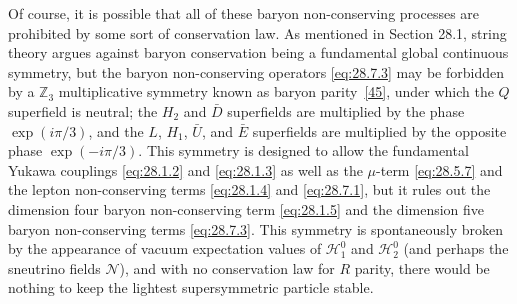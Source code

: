 Of course, it is possible that all of these baryon non-conserving processes
are prohibited by some sort of conservation law. As mentioned in Section
28.1, string theory argues against baryon conservation being a fundamental
global continuous symmetry, but the baryon non-conserving operators
\eqref{eq:28.7.3} may be forbidden by a \(\mathbb Z_3\) multiplicative
symmetry known as baryon parity~\hyperref[ch28-ref-45]{[45]}, under which the \(Q\)
superfield is neutral; the \(H_2\) and \(\bar D\) superfields are multiplied
by the phase \(\exp(i\pi/3)\), and the \(L\), \(H_1\), \(\bar U\), and
\(\bar E\) superfields are multiplied by the opposite phase
\(\exp(-i\pi/3)\). This symmetry is designed to allow the fundamental
Yukawa couplings \eqref{eq:28.1.2} and \eqref{eq:28.1.3} as well as the
\(\mu\)-term \eqref{eq:28.5.7} and the lepton non-conserving terms
\eqref{eq:28.1.4} and \eqref{eq:28.7.1}, but it rules out the dimension
four baryon non-conserving term \eqref{eq:28.1.5} and the dimension five
baryon non-conserving terms \eqref{eq:28.7.3}. This symmetry is
spontaneously broken by the appearance of vacuum expectation values of
\(\mathcal H_1^0\) and \(\mathcal H_2^0\) (and perhaps the sneutrino fields
\(\mathcal N\)), and with no conservation law for \(R\) parity, there would
be nothing to keep the lightest supersymmetric particle stable.
